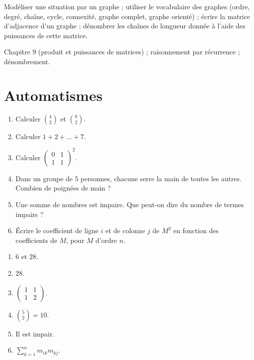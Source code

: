 
\begin{objectives}
Modéliser une situation par un graphe ; utiliser le vocabulaire des graphes (ordre, degré, chaîne, cycle, connexité, graphe complet, graphe orienté) ; écrire la matrice d'adjacence d'un graphe ; dénombrer les chaînes de longueur donnée à l'aide des puissances de cette matrice.
\end{objectives}
\begin{prerequisites}
Chapitre 9 (produit et puissances de matrices) ; raisonnement par récurrence ; dénombrement.
\end{prerequisites}

\section{Automatismes}
\begin{fluency}
\begin{enumerate}
\item Calculer $\binom 42$ et $\binom{8}{2}$.
\item Calculer $1+2+\dots+7$.
\item Calculer $\begin{pmatrix}0&1\\1&1\end{pmatrix}^2$.
\item Dans un groupe de $5$ personnes, chacune serre la main de toutes les autres. Combien de poignées de main ?
\item Une somme de nombres est impaire. Que peut-on dire du nombre de termes impairs ?
\item Écrire le coefficient de ligne $i$ et de colonne $j$ de $M^2$ en fonction des coefficients de $M$, pour $M$ d'ordre $n$.
\end{enumerate}
\end{fluency}
\begin{solution}[Automatismes]
\begin{enumerate}
\item $6$ et $28$.
\item $28$.
\item $\begin{pmatrix}1&1\\1&2\end{pmatrix}$.
\item $\binom52=10$.
\item Il est impair.
\item $\sum_{k=1}^{n}m_{ik}m_{kj}$.
\end{enumerate}
\end{solution}

